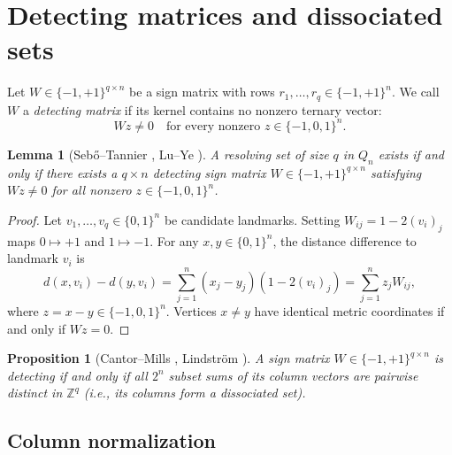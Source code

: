 \documentclass[11pt]{article}
\theoremstyle{plain}
\newtheorem{lemma}[theorem]{Lemma}
\newtheorem{proposition}[theorem]{Proposition}
\theoremstyle{definition}
\newcommand{\bits}{\{0,1\}}
\newcommand{\signs}{\{-1,+1\}}
\newcommand{\ternary}{\{-1,0,1\}}
\begin{document}
\section{Detecting matrices and dissociated sets}\label{sec:reduction}

Let $W \in \signs^{q\times n}$ be a sign matrix with rows $r_1, \dots, r_q \in \signs^n$. We call $W$ a \emph{detecting matrix} if its kernel contains no nonzero ternary vector:
\[
  Wz \neq 0 \quad \text{for every nonzero } z \in \ternary^n.
\]

\begin{lemma}[Seb\H{o}--Tannier \cite{sebotannier2004}, Lu--Ye \cite{luye2022}]\label{lem:equivalence}
A resolving set of size $q$ in $Q_n$ exists if and only if there exists a $q\times n$ detecting sign matrix $W \in \signs^{q \times n}$ satisfying $Wz \neq 0$ for all nonzero $z \in \ternary^n$.
\end{lemma}

\begin{proof}
Let $v_1, \dots, v_q \in \bits^n$ be candidate landmarks. Setting $W_{ij} = 1 - 2(v_i)_j$ maps $0 \mapsto +1$ and $1 \mapsto -1$. For any $x, y \in \bits^n$, the distance difference to landmark $v_i$ is
\[
  d(x,v_i) - d(y,v_i) = \sum_{j=1}^n (x_j - y_j)(1 - 2(v_i)_j) = \sum_{j=1}^n z_j W_{ij},
\]
where $z = x - y \in \ternary^n$. Vertices $x \neq y$ have identical metric coordinates if and only if $Wz = 0$.
\end{proof}

\begin{proposition}[Cantor--Mills \cite{cantormills1966}, Lindstr\"om \cite{lindstrom1969}]\label{prop:subsetsums}
A sign matrix $W \in \signs^{q\times n}$ is detecting if and only if all $2^n$ subset sums of its column vectors are pairwise distinct in $\mathbb{Z}^q$ (i.e., its columns form a dissociated set).
\end{proposition}

\subsection{Column normalization}
\end{document}
